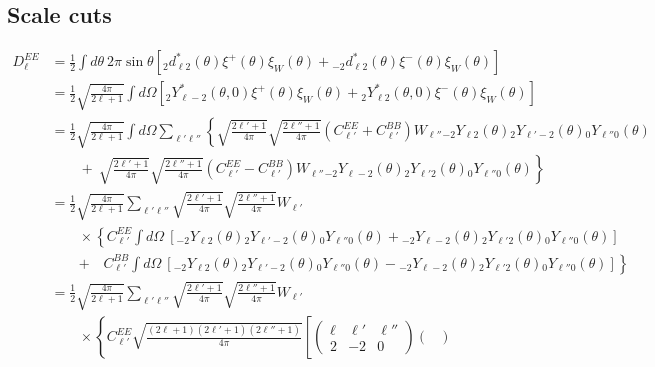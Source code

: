 \subsection{Scale cuts}

\begin{align}
    \nonumber D^{EE}_\ell &= \frac{1}{2}\int d\theta\:2\pi\sin\theta[{}_2 d^*_{\ell 2}(\theta) \xi^+(\theta)\xi_W(\theta) + {}_{-2} d^*_{\ell 2}(\theta) \xi^-(\theta)\xi_W(\theta)] \\
    &= \nonumber\frac{1}{2}\sqrt{\frac{4\pi}{2\ell+1}}\int d\Omega \left[{}_{2}Y^*_{\ell -2}(\theta, 0) \xi^+(\theta) \xi_W(\theta) + {}_{2}Y^*_{\ell 2}(\theta, 0) \xi^-(\theta) \xi_W(\theta)\right] \\
    &=\nonumber\frac{1}{2}\sqrt{\frac{4\pi}{2\ell+1}}\int d\Omega \sum_{\ell' \ell''}\left\{\sqrt{\frac{2\ell'+1}{4\pi}}\sqrt{\frac{2\ell''+1}{4\pi}}(C^{EE}_{\ell'} + C^{BB}_{\ell'})W_{\ell''}{}_{-2} Y_{\ell 2}(\theta) {}_{2} Y_{\ell' -2}(\theta) {}_{0} Y_{\ell'' 0}(\theta)\right.\\
    &\nonumber\left.\quad\quad  + \:\sqrt{\frac{2\ell'+1}{4\pi}}\sqrt{\frac{2\ell''+1}{4\pi}}(C^{EE}_{\ell'} - C^{BB}_{\ell'})W_{\ell''}{}_{-2} Y_{\ell -2}(\theta) {}_{2} Y_{\ell' 2}(\theta) {}_{0} Y_{\ell'' 0}(\theta)\right\}\\
    &=\nonumber\frac{1}{2}\sqrt{\frac{4\pi}{2\ell+1}}\sum_{\ell' \ell''}\sqrt{\frac{2\ell'+1}{4\pi}}\sqrt{\frac{2\ell''+1}{4\pi}}W_{\ell'}\\
    &\quad\quad\times\nonumber\left\{C^{EE}_{\ell'}\int d\Omega~\left[{}_{-2} Y_{\ell 2}(\theta) {}_{2} Y_{\ell' -2}(\theta) {}_{0} Y_{\ell'' 0}(\theta) + {}_{-2} Y_{\ell -2}(\theta) {}_{2} Y_{\ell' 2}(\theta) {}_{0} Y_{\ell'' 0}(\theta)\right]\right.\\
    &\nonumber\quad\quad\left.+\quad C^{BB}_{\ell'}\int d\Omega~\left[{}_{-2} Y_{\ell 2}(\theta) {}_{2} Y_{\ell'- 2}(\theta) {}_{0} Y_{\ell'' 0}(\theta) - {}_{-2} Y_{\ell -2}(\theta) {}_{2} Y_{\ell' 2}(\theta) {}_{0} Y_{\ell'' 0}(\theta)\right]\right\}\\
    &=\nonumber\frac{1}{2}\sqrt{\frac{4\pi}{2\ell+1}}\sum_{\ell' \ell''}\sqrt{\frac{2\ell'+1}{4\pi}}\sqrt{\frac{2\ell''+1}{4\pi}}W_{\ell'}\\
    &\nonumber\quad\quad\times\left\{C^{EE}_{\ell'}\sqrt{\frac{(2\ell+1)(2\ell'+1)(2\ell''+1)}{4\pi}}\left[\begin{pmatrix}
        \ell & \ell' & \ell'' \\
        2 & -2 & 0
    \end{pmatrix}\begin{pmatrix}

\end{pmatrix}
\end{align}
